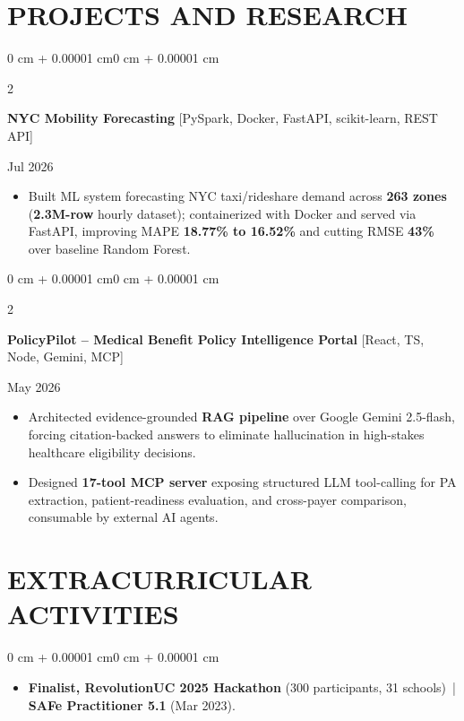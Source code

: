 \documentclass[10pt, letterpaper]{article}
\newenvironment{highlights}{
    \begin{itemize}[
        topsep=0.10 cm,
        parsep=0.06 cm,
        partopsep=0pt,
        itemsep=0.06 cm,
        leftmargin=12pt
    ]
}{
    \end{itemize}
}
\newenvironment{onecolentry}{
    \begin{adjustwidth}{0 cm + 0.00001 cm}{0 cm + 0.00001 cm}
}{
    \end{adjustwidth}
}
\newenvironment{twocolentry}[2][]{
    \onecolentry
    \def\secondColumn{#2}
    \setcolumnwidth{\fill, 4.5 cm}
    \begin{paracol}{2}
}{
    \switchcolumn \raggedleft \secondColumn
    \end{paracol}
    \endonecolentry
}
\begin{document}
\section{PROJECTS AND RESEARCH}
\begin{twocolentry}{Jul 2026}
\textbf{NYC Mobility Forecasting} [PySpark, Docker, FastAPI, scikit-learn, REST API]
\end{twocolentry}
\begin{highlights}
  \item Built ML system forecasting NYC taxi/rideshare demand across \textbf{263 zones} (\textbf{2.3M-row} hourly dataset); containerized with Docker and served via FastAPI, improving MAPE \textbf{18.77\% to 16.52\%} and cutting RMSE \textbf{43\%} over baseline Random Forest.
\end{highlights}

\vspace{0.12 cm}

\begin{twocolentry}{May 2026}
\textbf{PolicyPilot -- Medical Benefit Policy Intelligence Portal} [React, TS, Node, Gemini, MCP]
\end{twocolentry}
\begin{highlights}
  \item Architected evidence-grounded \textbf{RAG pipeline} over Google Gemini 2.5-flash, forcing citation-backed answers to eliminate hallucination in high-stakes healthcare eligibility decisions.
  \item Designed \textbf{17-tool MCP server} exposing structured LLM tool-calling for PA extraction, patient-readiness evaluation, and cross-payer comparison, consumable by external AI agents.
\end{highlights}

\section{EXTRACURRICULAR ACTIVITIES}
\begin{onecolentry}
\begin{highlights}
  \item \textbf{Finalist, RevolutionUC 2025 Hackathon} (300 participants, 31 schools) \,|\, \textbf{SAFe Practitioner 5.1} (Mar 2023).
\end{highlights}
\end{onecolentry}
\end{document}
